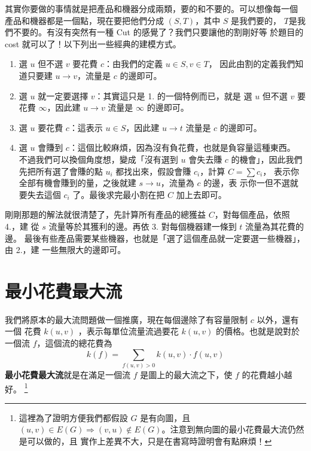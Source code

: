 \documentclass[a4paper,12pt]{book}
\begin{document}

其實你要做的事情就是把產品和機器分成兩類，要的和不要的。可以想像每一個
產品和機器都是一個點，現在要把他們分成 $(S, T)$，其中 $S$ 是我們要的，
$T$是我們不要的。有沒有突然有一種 Cut 的感覺了？我們只要讓他的割剛好等
於題目的 cost 就可以了！以下列出一些經典的建模方式。
\begin{enumerate}
  \item 選 $u$ 但不選 $v$ 要花費 $c$：由我們的定義 $u \in S, v \in T$，
    因此由割的定義我們知道只要建 $u \rightarrow v$，流量是 $c$ 的邊即可。
  \item 選 $u$ 就一定要選擇 $v$：其實這只是 1. 的一個特例而已，就是
    選 $u$ 但不選 $v$ 要花費 $\infty$，因此建 $u \rightarrow v$ 流量是 $\infty$ 
    的邊即可。
  \item 選 $u$ 要花費 $c$：這表示 $u \in S$，因此建 $u \rightarrow t$ 流量是
    $c$ 的邊即可。
  \item 選 $u$ 會賺到 $c$：這個比較麻煩，因為沒有負花費，也就是負容量這種東西。
    不過我們可以換個角度想，變成「沒有選到 $u$ 會失去賺 $c$ 的機會」，因此我們
    先把所有選了會賺的點 $u_i$ 都找出來，假設會賺 $c_i$，計算 $C = \sum c_i$，
    表示你全部有機會賺到的量，之後就建 $s \rightarrow u$，流量為 $c$ 的邊，表
    示你一但不選就要失去這個 $c_i$ 了。最後求完最小割在把 $C$ 加上去即可。
\end{enumerate}
剛剛那題的解法就很清楚了，先計算所有產品的總獲益 $C$，對每個產品，依照 4.，建
從 $s$ 流量等於其獲利的邊。再依 3. 對每個機器建一條到 $t$ 流量為其花費的邊。
最後有些產品需要某些機器，也就是「選了這個產品就一定要選一些機器」，由 2.，建
一些無限大的邊即可。

\section{最小花費最大流}
我們將原本的最大流問題做一個推廣，現在每個邊除了有容量限制 $c$ 以外，還有一個
花費 $k(u, v)$ ，表示每單位流量流過要花 $k(u, v)$ 的價格。也就是說對於一個流
$f$，這個流的總花費為
\[ k(f) = \sum_{f(u, v) > 0} k(u, v) \cdot f(u, v) \]
{\bf 最小花費最大流}就是在滿足一個流 $f$ 是圖上的最大流之下，使 $f$ 的花費越小越好。
\footnote{這裡為了證明方便我們都假設 $G$ 是有向圖，且 $(u, v) \in E(G) \Rightarrow 
  (v, u) \notin E(G)$。注意到無向圖的最小花費最大流仍然是可以做的，且
  實作上差異不大，只是在書寫時證明會有點麻煩！}
\end{document}
